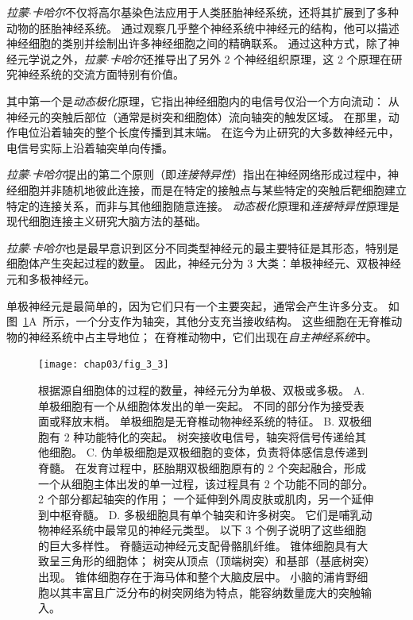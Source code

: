 \textit{拉蒙$\cdot$卡哈尔}不仅将高尔基染色法应用于人类胚胎神经系统，还将其扩展到了多种动物的胚胎神经系统。 
通过观察几乎整个神经系统中神经元的结构，他可以描述神经细胞的类别并绘制出许多神经细胞之间的精确联系。
通过这种方式，除了神经元学说之外，\textit{拉蒙$\cdot$卡哈尔}还推导出了另外 2 个神经组织原理，这 2 个原理在研究神经系统的交流方面特别有价值。


其中第一个是\textit{动态极化}原理，它指出神经细胞内的电信号仅沿一个方向流动：
从神经元的突触后部位（通常是树突和细胞体）流向轴突的触发区域。
在那里，动作电位沿着轴突的整个长度传播到其末端。
在迄今为止研究的大多数神经元中，电信号实际上沿着轴突单向传播。


\textit{拉蒙$\cdot$卡哈尔}提出的第二个原则（即\textit{连接特异性}）指出在神经网络形成过程中，神经细胞并非随机地彼此连接，而是在特定的接触点与某些特定的突触后靶细胞建立特定的连接关系，而非与其他细胞随意连接。
\textit{动态极化}原理和\textit{连接特异性}原理是现代细胞连接主义研究大脑方法的基础。


\textit{拉蒙$\cdot$卡哈尔}也是最早意识到区分不同类型神经元的最主要特征是其形态，特别是细胞体产生突起过程的数量。 
因此，神经元分为 3 大类：单极神经元、双极神经元和多极神经元。


单极神经元是最简单的，因为它们只有一个主要突起，通常会产生许多分支。
如图~\ref{fig:3_3}A~所示，一个分支作为轴突，其他分支充当接收结构。
这些细胞在无脊椎动物的神经系统中占主导地位；
在脊椎动物中，它们出现在\textit{自主神经系统}中。


\begin{figure}[htbp]
	\centering
	\texttt{[image: chap03/fig\_3\_3]}
	\caption{根据源自细胞体的过程的数量，神经元分为单极、双极或多极。 
		A. 单极细胞有一个从细胞体发出的单一突起。
		不同的部分作为接受表面或释放末梢。
		单极细胞是无脊椎动物神经系统的特征。 
		B. 双极细胞有 2 种功能特化的突起。
		树突接收电信号，轴突将信号传递给其他细胞。
		C. 伪单极细胞是双极细胞的变体，负责将体感信息传递到脊髓。
		在发育过程中，胚胎期双极细胞原有的 2 个突起融合，形成一个从细胞主体出发的单一过程，该过程具有 2 个功能不同的部分。
		 2 个部分都起轴突的作用；
		一个延伸到外周皮肤或肌肉，另一个延伸到中枢脊髓\cite{ross2006histology}。
		D. 多极细胞具有单个轴突和许多树突。 
		它们是哺乳动物神经系统中最常见的神经元类型。 
		以下 3 个例子说明了这些细胞的巨大多样性。
		脊髓运动神经元支配骨骼肌纤维。
		锥体细胞具有大致呈三角形的细胞体；
		树突从顶点（顶端树突）和基部（基底树突）出现。 
		锥体细胞存在于海马体和整个大脑皮层中。 
	小脑的浦肯野细胞以其丰富且广泛分布的树突网络为特点，能容纳数量庞大的突触输入\cite{ross2006histology}。}
	\label{fig:3_3}
\end{figure}


